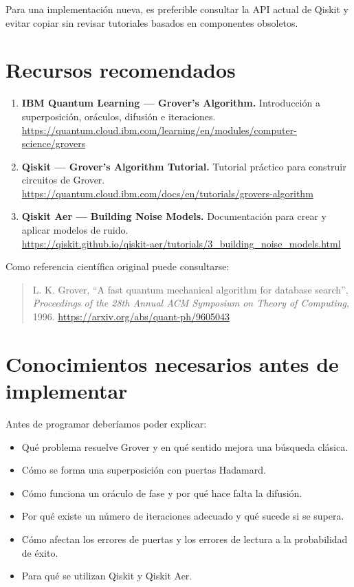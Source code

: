 \documentclass[11pt,a4paper]{article}
\begin{document}
Para una implementación nueva, es preferible consultar la API actual de Qiskit y evitar copiar sin revisar tutoriales basados en componentes obsoletos.

\section{Recursos recomendados}

\begin{enumerate}
    \item \textbf{IBM Quantum Learning --- Grover's Algorithm.} Introducción a superposición, oráculos, difusión e iteraciones.\\
    \url{https://quantum.cloud.ibm.com/learning/en/modules/computer-science/grovers}
    \item \textbf{Qiskit --- Grover's Algorithm Tutorial.} Tutorial práctico para construir circuitos de Grover.\\
    \url{https://quantum.cloud.ibm.com/docs/en/tutorials/grovers-algorithm}
    \item \textbf{Qiskit Aer --- Building Noise Models.} Documentación para crear y aplicar modelos de ruido.\\
    \url{https://qiskit.github.io/qiskit-aer/tutorials/3_building_noise_models.html}
\end{enumerate}

Como referencia científica original puede consultarse:
\begin{quote}
L. K. Grover, ``A fast quantum mechanical algorithm for database search'', \emph{Proceedings of the 28th Annual ACM Symposium on Theory of Computing}, 1996. \url{https://arxiv.org/abs/quant-ph/9605043}
\end{quote}

\section{Conocimientos necesarios antes de implementar}

Antes de programar deberíamos poder explicar:
\begin{itemize}
    \item Qué problema resuelve Grover y en qué sentido mejora una búsqueda clásica.
    \item Cómo se forma una superposición con puertas Hadamard.
    \item Cómo funciona un oráculo de fase y por qué hace falta la difusión.
    \item Por qué existe un número de iteraciones adecuado y qué sucede si se supera.
    \item Cómo afectan los errores de puertas y los errores de lectura a la probabilidad de éxito.
    \item Para qué se utilizan Qiskit y Qiskit Aer.
\end{itemize}
\end{document}
